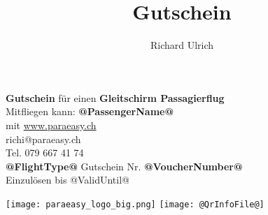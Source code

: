 \documentclass[a5paper, landscape, pagenumber=no]{scrartcl}
\begin{document}
\author{Richard Ulrich}
\title{Gutschein}


\begin{center}
\raggedleft
{\huge\textbf{Gutschein}} für einen {\huge\textbf{Gleitschirm Passagierflug}}\\
Mitfliegen kann: {\LARGE \textbf{@PassengerName@}}\\
mit \url{www.paraeasy.ch}\\
richi@paraeasy.ch\\
Tel. 079 667 41 74\\
\textbf{@FlightType@} Gutschein Nr. \textbf{@VoucherNumber@}\\
Einzulösen bis @ValidUntil@\\
\end{center}

\texttt{[image: paraeasy\_logo\_big.png]} 
\texttt{[image: @QrInfoFile@]} 
\end{document}
